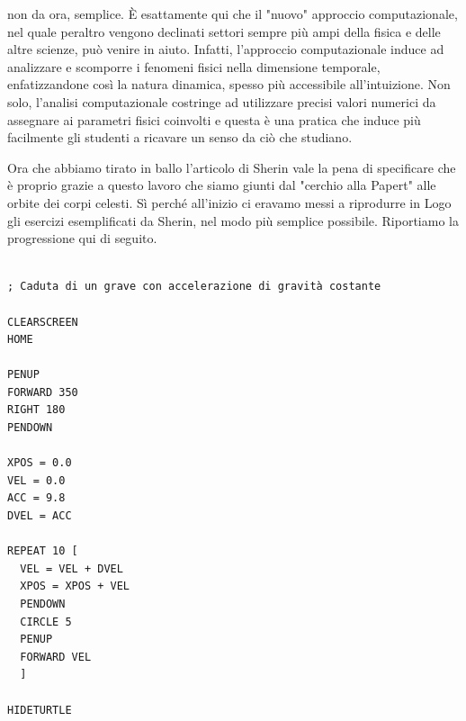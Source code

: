 non da ora, semplice. È esattamente qui che il "nuovo" approccio computazionale, nel quale peraltro vengono declinati settori sempre più ampi della fisica e delle altre scienze, può venire in aiuto. Infatti, l'approccio computazionale induce ad analizzare e scomporre i fenomeni fisici nella dimensione temporale, enfatizzandone così la natura dinamica, spesso più accessibile all'intuizione. Non solo, l'analisi computazionale costringe ad utilizzare precisi valori numerici da assegnare ai parametri fisici coinvolti e questa è una pratica che induce più facilmente gli studenti a ricavare un senso da ciò che studiano.

Ora che abbiamo tirato in ballo l'articolo di Sherin vale la pena di specificare che è proprio grazie a questo lavoro che siamo giunti dal "cerchio alla Papert" alle orbite dei corpi celesti. Sì perché all'inizio ci eravamo messi a riprodurre in Logo gli esercizi esemplificati da Sherin, nel modo più semplice possibile. Riportiamo la progressione qui di seguito.

\vskip 1cm

\lstset{extendedchars=true, basicstyle=\scriptsize} 
\begin{lstlisting}[frame=single]  % Start your code-block

; Caduta di un grave con accelerazione di gravità costante

CLEARSCREEN
HOME

PENUP
FORWARD 350
RIGHT 180
PENDOWN

XPOS = 0.0
VEL = 0.0
ACC = 9.8
DVEL = ACC

REPEAT 10 [
  VEL = VEL + DVEL
  XPOS = XPOS + VEL
  PENDOWN
  CIRCLE 5
  PENUP
  FORWARD VEL
  ]

HIDETURTLE
\end{lstlisting}

